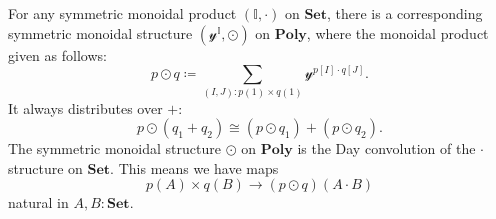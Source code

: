 \documentclass[11pt, one side, article]{memoir}
\theoremstyle{definition}
\theoremstyle{plain}
\newcommand{\Cat}[1]{\mathbf{#1}}%
\newcommand{\smset}{\Cat{Set}}
\newcommand{\yon}{{\mathcal{y}}}
\newcommand{\poly}{\Cat{Poly}}
\newcommand{\0}{\textsf{0}}
\newcommand{\1}{\tn{\textsf{1}}}
\begin{document}
For any symmetric monoidal product $(\mathbb{I},\cdot)$ on $\smset$, there is a corresponding symmetric monoidal structure $(\yon^\mathbb{I},\odot)$ on $\poly$, where the monoidal product given as follows:
\begin{equation}\label{eqn.day_all}
p\odot q\coloneqq\sum_{(I,J): p(1)\times q(1)}\yon^{p[I]\cdot q[J]}.
\end{equation}
It always distributes over $+$:
\begin{equation}\label{eqn.day_distributes}
p\odot(q_1+q_2)\cong (p\odot q_1)+(p\odot q_2).
\end{equation}
The symmetric monoidal structure $\odot$ on $\poly$ is the Day convolution of the $\cdot$ structure on $\smset$. This means we have maps
\begin{equation}\label{eqn.Day}
	p(A)\times q(B)\to (p\odot q)(A\cdot B)
\end{equation}
natural in $A,B:\smset$. 
\end{document}
